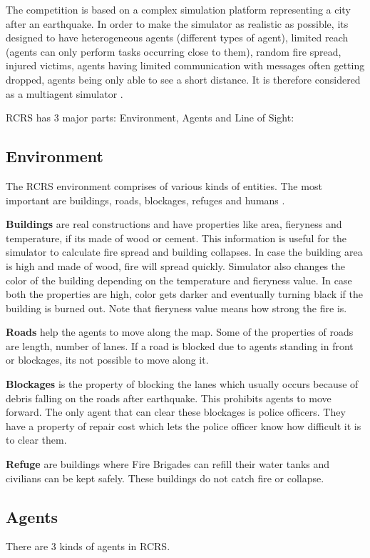 \documentclass[12pt]{report}
\begin{document}
The competition is based on a complex simulation platform representing a city after an earthquake. In order to make the simulator as realistic as possible, its designed to have heterogeneous agents (different types of agent), limited reach (agents can only perform tasks occurring close to them), random fire spread, injured victims, agents having limited communication with messages often getting dropped, agents being only able to see a short distance. It is therefore considered as a multiagent simulator \cite{Kitano}.  

RCRS has 3 major parts: Environment, Agents and Line of Sight:

\subsection{Environment}

The RCRS environment comprises of various kinds of entities. The most important are buildings, roads, blockages, refuges and humans \cite{Morimoto}. 


\textbf{Buildings} are real constructions and have properties like area, fieryness and temperature, if its made of wood or cement. This information is useful for the simulator to calculate fire spread and building collapses. In case the building area is high and made of wood, fire will spread quickly. Simulator also changes the color of the building depending on the temperature and fieryness value. In case both the properties are high, color gets darker and eventually turning black if the building is burned out. Note that fieryness value means how strong the fire is. 

\textbf{Roads} help the agents to move along the map. Some of the properties of roads are length, number of lanes. If a road is blocked due to agents standing in front or blockages, its not possible to move along it. 

\textbf{Blockages} is the property of blocking the lanes which usually occurs because of debris falling on the roads after earthquake. This prohibits agents to move forward. The only agent that can clear these blockages is police officers. They have a property of repair cost which lets the police officer know how difficult it is to clear them. 

\textbf{Refuge} are buildings where Fire Brigades can refill their water tanks and civilians can be kept safely. These buildings do not catch fire or collapse. 

\subsection{Agents} There are 3 kinds of agents in RCRS. 
\end{document}

